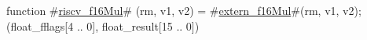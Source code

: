 function #\hyperref[sailRISCVzriscvzyf16Mul]{riscv\_f16Mul}# (rm, v1, v2) = {
  #\hyperref[sailRISCVzexternzyf16Mul]{extern\_f16Mul}#(rm, v1, v2);
  (float_fflags[4 .. 0], float_result[15 .. 0])
}
